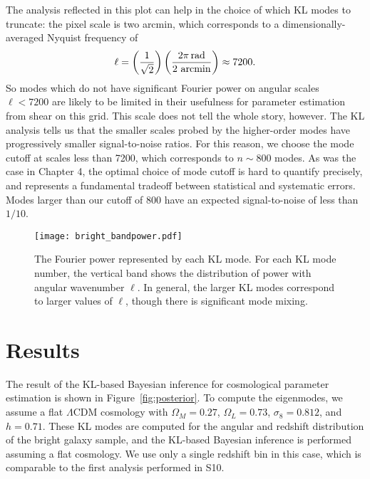 The analysis reflected in this plot can help in the choice of which KL
modes to truncate: the pixel scale is two arcmin, which corresponds to
a dimensionally-averaged Nyquist frequency of
\begin{equation}
  \ell = \left(\frac{1}{\sqrt{2}}\right)
  \left(\frac{2\pi\, {\rm rad}}{2\ {\rm arcmin}}\right) \approx 7200.
\end{equation}
So modes which do not have significant Fourier power on angular scales
$\ell < 7200$ are likely to be limited in their usefulness for parameter
estimation from shear on this grid.  This scale does not tell the whole story,
however.  The KL analysis tells us that the smaller scales probed by the
higher-order modes have progressively smaller signal-to-noise ratios.  For
this reason, we choose the mode cutoff at scales less than 7200, which
corresponds to $n \sim 800$ modes.  As was the case in Chapter 4, the
optimal choice of mode cutoff is hard to quantify precisely, and represents
a fundamental tradeoff between statistical and systematic errors.
Modes larger than our cutoff of 800 have an expected signal-to-noise of
less than $1/10$.

\begin{figure*}
 \centering
 \texttt{[image: bright\_bandpower.pdf]}
 \caption[The Fourier power represented by each KL mode]{
   The Fourier power represented by each KL mode.  For each KL mode number,
   the vertical band shows the distribution of power with angular wavenumber
   $\ell$.  In general, the larger KL modes correspond to larger values of
   $\ell$, though there is significant mode mixing.
   \label{fig:bandpower_masked}}
\end{figure*}

\section{Results}
\label{sec:results}

The result of the KL-based Bayesian inference for cosmological parameter
estimation is shown in Figure~\ref{fig:posterior}.  To compute the
eigenmodes, we assume a flat $\Lambda$CDM cosmology with
$\Omega_M = 0.27$, $\Omega_L = 0.73$, $\sigma_8 = 0.812$, and $h=0.71$.
These KL modes are computed for the angular and redshift distribution
of the bright galaxy sample, and the KL-based Bayesian inference is
performed assuming a flat cosmology.  We use only a single redshift bin in
this case, which is comparable to the first analysis performed in
S10.

